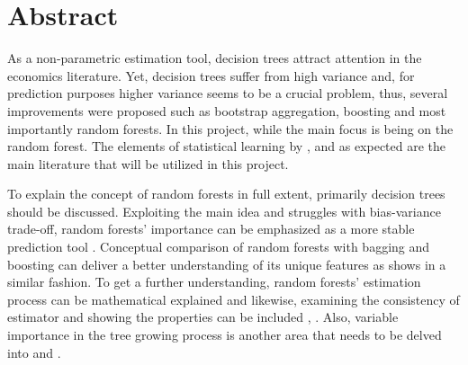 \chapter*{Abstract}
As a non-parametric estimation tool, decision trees attract attention in the economics literature. 
Yet, decision trees suffer from high variance and, 
for prediction purposes higher variance seems to be a crucial problem, thus, 
several improvements were proposed such as bootstrap aggregation, boosting and most importantly random forests. 
In this project, while the main focus is being on the random forest.
The elements of statistical learning by \cite{friedman2001elements} \cite{varian2014big} \cite{maimon2005data},
\cite{louppe2014understanding} and as expected \cite{breiman2001random} are the main literature 
that will be utilized in this project.

To explain the concept of random forests in full extent, primarily decision trees should be discussed. 
Exploiting the main idea and struggles with bias-variance trade-off, 
random forests' importance can be emphasized as a more stable prediction tool \cite{maimon2005data}. 
Conceptual comparison of random forests with bagging and boosting can deliver a better understanding of 
its unique features as \cite{lee2019bootstrap} shows in a similar fashion. To get a further understanding, 
random forests’ estimation process can be mathematical explained \cite{biau2012analysis} and likewise, 
examining the consistency of estimator and showing the properties can be included \cite{breiman2004consistency}, 
\cite{denil2014narrowing}. Also, variable importance in the tree growing process is another area that needs to be 
delved into \cite{ishwaran2007variable} and \cite{louppe2013understanding}.
